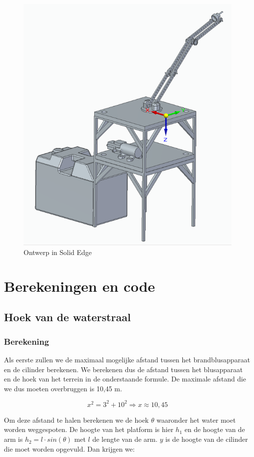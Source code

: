 \documentclass[kulak]{kulakarticle} %
\begin{document}
			\begin{figure} [!h]
				\centering
				\includegraphics[width = .6 \textwidth]{Solid Edge Assembly foto}
				\caption{Ontwerp in Solid Edge}
				\label{ontwerp}
			\end{figure}



\section{Berekeningen en code}

	\subsection{Hoek van de waterstraal}
	
		\subsubsection{Berekening}
		
			Als eerste zullen we de maximaal mogelijke afstand tussen het brandblusapparaat en de cilinder berekenen. We berekenen dus de afstand tussen het blusapparaat en de hoek van het terrein in de onderstaande formule. De maximale afstand die we dus moeten overbruggen is 10,45 m.
		
				\begin{equation}
					x^2 = 3^2 + 10^2
					\Rightarrow x \approx 10,45 
				\end{equation}
				
			Om deze afstand te halen berekenen we de hoek $\theta$ waaronder het water moet worden weggespoten. De hoogte van het platform is hier \(h_1\) en de hoogte van de arm is \(h_2 = l \cdot sin(\theta)\) met \(l\) de lengte van de arm. \(y\) is de hoogte van de cilinder die moet worden opgevuld. Dan krijgen we:
			
\end{document}

